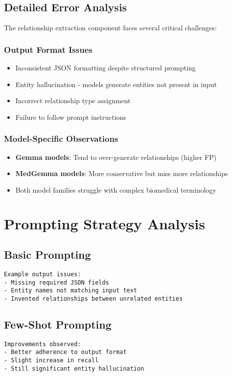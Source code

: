 \subsection{Detailed Error Analysis}

The relationship extraction component faces several critical challenges:

\subsubsection{Output Format Issues}
\begin{itemize}
    \item Inconsistent JSON formatting despite structured prompting
    \item Entity hallucination - models generate entities not present in input
    \item Incorrect relationship type assignment
    \item Failure to follow prompt instructions
\end{itemize}

\subsubsection{Model-Specific Observations}
\begin{itemize}
    \item \textbf{Gemma models}: Tend to over-generate relationships (higher FP)
    \item \textbf{MedGemma models}: More conservative but miss more relationships
    \item Both model families struggle with complex biomedical terminology
\end{itemize}

\section{Prompting Strategy Analysis}

\subsection{Basic Prompting}
\begin{verbatim}
Example output issues:
- Missing required JSON fields
- Entity names not matching input text
- Invented relationships between unrelated entities
\end{verbatim}

\subsection{Few-Shot Prompting}
\begin{verbatim}
Improvements observed:
- Better adherence to output format
- Slight increase in recall
- Still significant entity hallucination
\end{verbatim}

